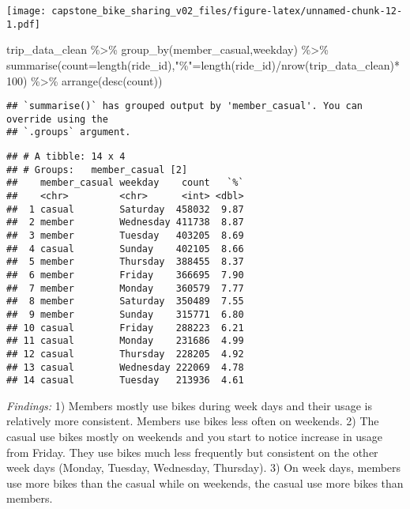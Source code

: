\documentclass[
]{article}
\newenvironment{Shaded}{\begin{snugshade}}{\end{snugshade}}
\newcommand{\AttributeTok}[1]{\textcolor[rgb]{0.77,0.63,0.00}{#1}}
\newcommand{\DecValTok}[1]{\textcolor[rgb]{0.00,0.00,0.81}{#1}}
\newcommand{\FunctionTok}[1]{\textcolor[rgb]{0.00,0.00,0.00}{#1}}
\newcommand{\NormalTok}[1]{#1}
\newcommand{\OtherTok}[1]{\textcolor[rgb]{0.56,0.35,0.01}{#1}}
\newcommand{\SpecialCharTok}[1]{\textcolor[rgb]{0.00,0.00,0.00}{#1}}
\newcommand{\StringTok}[1]{\textcolor[rgb]{0.31,0.60,0.02}{#1}}
\begin{document}
\texttt{[image: capstone\_bike\_sharing\_v02\_files/figure-latex/unnamed-chunk-12-1.pdf]}

\begin{Shaded}
\begin{Highlighting}[]
\NormalTok{trip\_data\_clean }\SpecialCharTok{\%\textgreater{}\%} \FunctionTok{group\_by}\NormalTok{(member\_casual,weekday) }\SpecialCharTok{\%\textgreater{}\%} \FunctionTok{summarise}\NormalTok{(}\AttributeTok{count=}\FunctionTok{length}\NormalTok{(ride\_id),}\StringTok{"\%"}\OtherTok{=}\FunctionTok{length}\NormalTok{(ride\_id)}\SpecialCharTok{/}\FunctionTok{nrow}\NormalTok{(trip\_data\_clean)}\SpecialCharTok{*}\DecValTok{100}\NormalTok{) }\SpecialCharTok{\%\textgreater{}\%} \FunctionTok{arrange}\NormalTok{(}\FunctionTok{desc}\NormalTok{(count))}
\end{Highlighting}
\end{Shaded}

\begin{verbatim}
## `summarise()` has grouped output by 'member_casual'. You can override using the
## `.groups` argument.
\end{verbatim}

\begin{verbatim}
## # A tibble: 14 x 4
## # Groups:   member_casual [2]
##    member_casual weekday    count   `%`
##    <chr>         <chr>      <int> <dbl>
##  1 casual        Saturday  458032  9.87
##  2 member        Wednesday 411738  8.87
##  3 member        Tuesday   403205  8.69
##  4 casual        Sunday    402105  8.66
##  5 member        Thursday  388455  8.37
##  6 member        Friday    366695  7.90
##  7 member        Monday    360579  7.77
##  8 member        Saturday  350489  7.55
##  9 member        Sunday    315771  6.80
## 10 casual        Friday    288223  6.21
## 11 casual        Monday    231686  4.99
## 12 casual        Thursday  228205  4.92
## 13 casual        Wednesday 222069  4.78
## 14 casual        Tuesday   213936  4.61
\end{verbatim}

\emph{Findings:} 1) Members mostly use bikes during week days and their
usage is relatively more consistent. Members use bikes less often on
weekends. 2) The casual use bikes mostly on weekends and you start to
notice increase in usage from Friday. They use bikes much less
frequently but consistent on the other week days (Monday, Tuesday,
Wednesday, Thursday). 3) On week days, members use more bikes than the
casual while on weekends, the casual use more bikes than members.
\end{document}
